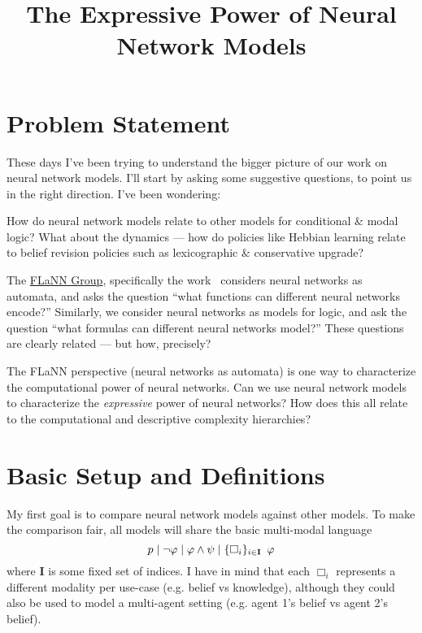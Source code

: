 \documentclass[letterpaper]{article}
\title{The Expressive Power of Neural Network Models}
\begin{document}
\maketitle

\section*{Problem Statement}

These days I've been trying to understand the bigger picture of our work on neural network models.  I'll start by asking some suggestive questions, to point us in the right direction. I've been wondering:

\begin{question}
    How do neural network models relate to other models for conditional \& modal logic?  What about the dynamics --- how do policies like Hebbian learning relate to belief revision policies such as lexicographic \& conservative upgrade?
\end{question}

\begin{question}
    The \href{http://flann.super.site/}{FLaNN Group}, specifically the work~\cite{merrill2019sequential,merrill2020formal,merrill2023expressive,strobl2024formal} considers neural networks as automata, and asks the question ``what functions can different neural networks encode?''  Similarly, we consider neural networks as models for logic, and ask the question ``what formulas can different neural networks model?''  These questions are clearly related --- but how, precisely?
\end{question}

\begin{question}
    The FLaNN perspective (neural networks as automata) is one way to characterize the computational power of neural networks.  Can we use neural network models to characterize the \emph{expressive} power of neural networks?  How does this all relate to the computational and descriptive complexity hierarchies?
\end{question}

\section*{Basic Setup and Definitions}

My first goal is to compare neural network models against other models.  To make the comparison fair, all models will share the basic multi-modal language
\[
    p \mid \neg \varphi \mid \varphi \land \psi \mid \{ \Box_i \}_{i \in \textbf{I}} \hspace*{0.5em} \varphi
\]
where \textbf{I} is some fixed set of indices.  I have in mind that each $\Box_i$ represents a different modality per use-case (e.g. belief vs knowledge), although they could also be used to model a multi-agent setting (e.g. agent 1's belief vs agent 2's belief).
\end{document}
